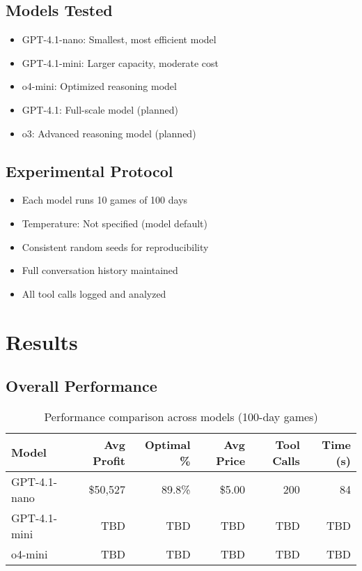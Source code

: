 \documentclass[11pt]{article}
\begin{document}
\subsection{Models Tested}

\begin{itemize}
    \item GPT-4.1-nano: Smallest, most efficient model
    \item GPT-4.1-mini: Larger capacity, moderate cost
    \item o4-mini: Optimized reasoning model
    \item GPT-4.1: Full-scale model (planned)
    \item o3: Advanced reasoning model (planned)
\end{itemize}

\subsection{Experimental Protocol}

\begin{itemize}
    \item Each model runs 10 games of 100 days
    \item Temperature: Not specified (model default)
    \item Consistent random seeds for reproducibility
    \item Full conversation history maintained
    \item All tool calls logged and analyzed
\end{itemize}

\section{Results}

\subsection{Overall Performance}

\begin{table}[h]
\centering
\begin{tabular}{lrrrrr}
\toprule
Model & Avg Profit & Optimal \% & Avg Price & Tool Calls & Time (s) \\
\midrule
GPT-4.1-nano & \$50,527 & 89.8\% & \$5.00 & 200 & 84 \\
GPT-4.1-mini & TBD & TBD & TBD & TBD & TBD \\
o4-mini & TBD & TBD & TBD & TBD & TBD \\
\bottomrule
\end{tabular}
\caption{Performance comparison across models (100-day games)}
\label{tab:results}
\end{table}
\end{document}

